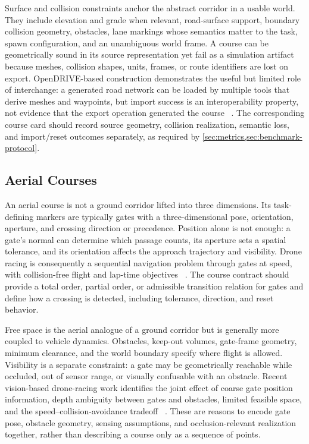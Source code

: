 Surface and collision constraints anchor the abstract corridor in a usable
world.  They include elevation and grade when relevant, road-surface support,
boundary collision geometry, obstacles, lane markings whose semantics matter to
the task, spawn configuration, and an unambiguous world frame.  A course can be
geometrically sound in its source representation yet fail as a simulation
artifact because meshes, collision shapes, units, frames, or route identifiers
are lost on export.  OpenDRIVE-based construction demonstrates the useful but
limited role of interchange: a generated road network can be loaded by multiple
tools that derive meshes and waypoints, but import success is an interoperability
property, not evidence that the export operation generated the course
~\cite{Muktadir2023ProceduralGeneration}.  The corresponding course card should
record source geometry, collision realization, semantic loss, and import/reset
outcomes separately, as required by \cref{sec:metrics,sec:benchmark-protocol}.

\subsection{Aerial Courses}

An aerial course is not a ground corridor lifted into three dimensions.  Its
task-defining markers are typically gates with a three-dimensional pose,
orientation, aperture, and crossing direction or precedence.  Position alone is
not enough: a gate's normal can determine which passage counts, its aperture
sets a spatial tolerance, and its orientation affects the approach trajectory and
visibility.  Drone racing is consequently a sequential navigation problem
through gates at speed, with collision-free flight and lap-time objectives
~\cite{Kaufmann2018DeepDrone}.  The course contract should provide a total order,
partial order, or admissible transition relation for gates and define how a
crossing is detected, including tolerance, direction, and reset behavior.

Free space is the aerial analogue of a ground corridor but is generally more
coupled to vehicle dynamics.  Obstacles, keep-out volumes, gate-frame geometry,
minimum clearance, and the world boundary specify where flight is allowed.
Visibility is a separate constraint: a gate may be geometrically reachable while
occluded, out of sensor range, or visually confusable with an obstacle.  Recent
vision-based drone-racing work identifies the joint effect of coarse gate
position information, depth ambiguity between gates and obstacles, limited
feasible space, and the speed--collision-avoidance tradeoff
~\cite{Yu2025MasteringDiverse}.  These are reasons to encode gate pose, obstacle
geometry, sensing assumptions, and occlusion-relevant realization together,
rather than describing a course only as a sequence of points.

